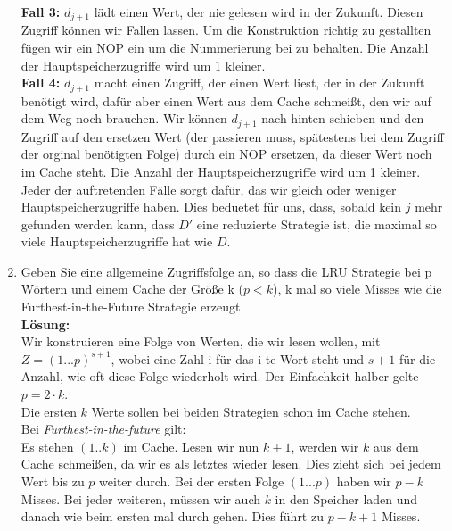 \documentclass[11pt,a4paper,ngerman]{article}
\begin{document}
\begin{enumerate}[\bfseries (a)]
\textbf{Fall 3:} $d_{j+1}$ lädt einen Wert, der nie gelesen wird in der Zukunft. Diesen Zugriff können wir Fallen lassen. Um die Konstruktion richtig zu gestallten fügen wir ein NOP ein um die Nummerierung bei zu behalten. Die Anzahl der Hauptspeicherzugriffe wird um 1 kleiner.\\

\textbf{Fall 4:} $d_{j+1}$ macht einen Zugriff, der einen Wert liest, der in der Zukunft benötigt wird, dafür aber einen Wert aus dem Cache schmeißt, den wir auf dem Weg noch brauchen. Wir können $d_{j+1}$ nach hinten schieben und den Zugriff auf den ersetzen Wert (der passieren muss, spätestens bei dem Zugriff der orginal benötigten Folge) durch ein NOP ersetzen, da dieser Wert noch im Cache steht. Die Anzahl der Hauptspeicherzugriffe wird um 1 kleiner.\\

Jeder der auftretenden Fälle sorgt dafür, das wir gleich oder weniger Hauptspeicherzugriffe haben. Dies beduetet für uns, dass, sobald kein $j$ mehr gefunden werden kann, dass $D'$ eine reduzierte Strategie ist, die maximal so viele Hauptspeicherzugriffe hat wie $D$.

\item Geben Sie eine allgemeine Zugriffsfolge an, so dass die LRU Strategie bei p Wörtern und einem Cache der Größe k ($p<k$),  k mal so viele Misses wie die Furthest-in-the-Future Strategie erzeugt.\\

\textbf{Lösung:}\\

Wir konstruieren eine Folge von Werten, die wir lesen wollen, mit $Z = (1 ... p)^{s+1}$, wobei eine Zahl i für das i-te Wort steht und $s+1$ für die Anzahl, wie oft diese Folge wiederholt wird. Der Einfachkeit halber gelte $p = 2 \cdot k$.\\

Die ersten $k$ Werte sollen bei beiden Strategien schon im Cache stehen.\\

Bei \emph{Furthest-in-the-future} gilt:\\
Es stehen $(1..k)$ im Cache. Lesen wir nun $k+1$, werden wir $k$ aus dem Cache schmeißen, da wir es als letztes wieder lesen. Dies zieht sich bei jedem Wert bis zu $p$ weiter durch. Bei der ersten Folge $(1...p)$ haben wir $p - k$ Misses. Bei jeder weiteren, müssen wir auch $k$ in den Speicher laden und danach wie beim ersten mal durch gehen. Dies führt zu $p-k+1$ Misses.\\


\end{enumerate}
\end{document}
